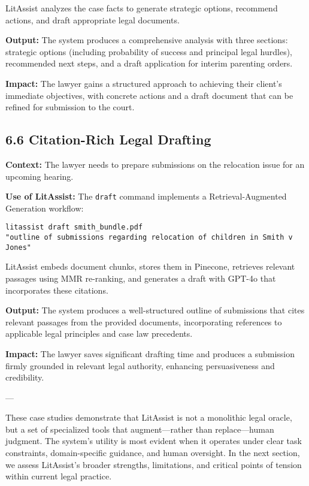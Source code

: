 \documentclass[12pt,a4paper]{article}
\begin{document}
LitAssist analyzes the case facts to generate strategic options, recommend actions, and draft appropriate legal documents.

\textbf{Output:} The system produces a comprehensive analysis with three sections: strategic options (including probability of success and principal legal hurdles), recommended next steps, and a draft application for interim parenting orders.

\textbf{Impact:} The lawyer gains a structured approach to achieving their client's immediate objectives, with concrete actions and a draft document that can be refined for submission to the court.

\subsection*{6.6 Citation-Rich Legal Drafting}

\textbf{Context:} The lawyer needs to prepare submissions on the relocation issue for an upcoming hearing.

\textbf{Use of LitAssist:} The \texttt{draft} command implements a Retrieval-Augmented Generation workflow:

\begin{verbatim}
litassist draft smith_bundle.pdf 
"outline of submissions regarding relocation of children in Smith v Jones"
\end{verbatim}

LitAssist embeds document chunks, stores them in Pinecone, retrieves relevant passages using MMR re-ranking, and generates a draft with GPT-4o that incorporates these citations.

\textbf{Output:} The system produces a well-structured outline of submissions that cites relevant passages from the provided documents, incorporating references to applicable legal principles and case law precedents.

\textbf{Impact:} The lawyer saves significant drafting time and produces a submission firmly grounded in relevant legal authority, enhancing persuasiveness and credibility.

---

These case studies demonstrate that LitAssist is not a monolithic legal oracle, but a set of specialized tools that augment—rather than replace—human judgment. The system's utility is most evident when it operates under clear task constraints, domain-specific guidance, and human oversight. In the next section, we assess LitAssist's broader strengths, limitations, and critical points of tension within current legal practice.
\end{document}
